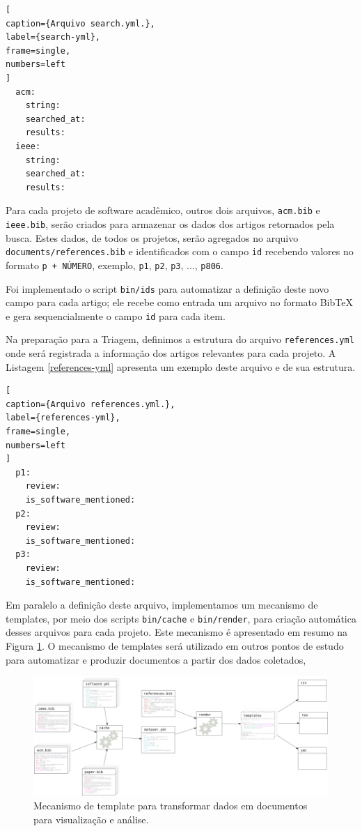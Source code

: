\begin{lstlisting}[
caption={Arquivo search.yml.},
label={search-yml},
frame=single,
numbers=left
]
  acm:
    string:
    searched_at:
    results:
  ieee:
    string:
    searched_at:
    results:
\end{lstlisting}

Para cada projeto de software acadêmico, outros dois arquivos,
\texttt{acm.bib} e \texttt{ieee.bib}, serão criados para armazenar os dados dos artigos
retornados pela busca. Estes dados, de todos os projetos, serão agregados no
arquivo \texttt{documents/references.bib} e identificados com
o campo \texttt{id} recebendo valores no formato \texttt{p + NÚMERO},
exemplo, \texttt{p1}, \texttt{p2}, \texttt{p3}, ..., \texttt{p806}.

Foi implementado o script \texttt{bin/ids} para automatizar a
definição deste novo campo para cada artigo; ele recebe como entrada um arquivo
no formato BibTeX e gera sequencialmente o campo \texttt{id} para cada item.


Na preparação para a Triagem,
definimos a estrutura do arquivo \texttt{references.yml} onde será registrada a
informação dos artigos relevantes para cada projeto. A Listagem
\ref{references-yml} apresenta um exemplo deste arquivo e de sua estrutura.

\begin{lstlisting}[
caption={Arquivo references.yml.},
label={references-yml},
frame=single,
numbers=left
]
  p1:
    review:
    is_software_mentioned:
  p2:
    review:
    is_software_mentioned:
  p3:
    review:
    is_software_mentioned:
\end{lstlisting}

Em paralelo a definição deste arquivo, implementamos um mecanismo de templates,
por meio dos scripts \texttt{bin/cache} e \texttt{bin/render}, para criação
automática desses arquivos para cada projeto. 
Este mecanismo é apresentado em resumo na Figura
\ref{template-fluxograma}.
O mecanismo de templates será
utilizado em outros pontos de estudo para automatizar e produzir documentos a
partir dos dados coletados, 

\begin{figure}[h]
  \center
  \includegraphics[scale=0.3]{imagens/template-fluxograma.png}
  \caption{Mecanismo de template para transformar dados em documentos para visualização e análise.}
  \label{template-fluxograma}
\end{figure}

